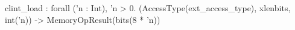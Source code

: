 clint_load : forall ('n : Int), 'n > 0. (AccessType(ext_access_type), xlenbits, int('n)) -> MemoryOpResult(bits(8 * 'n))